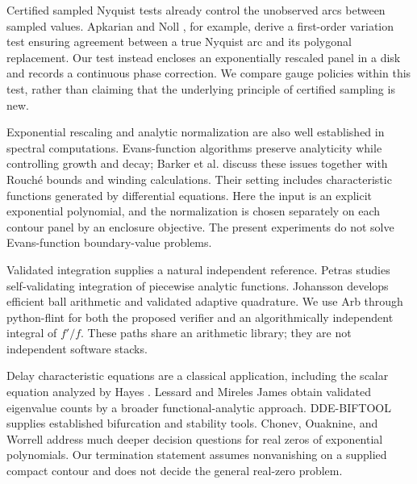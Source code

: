 \documentclass[11pt,a4paper]{article}
\begin{document}
Certified sampled Nyquist tests already control the unobserved arcs between sampled values. Apkarian and Noll \cite{apkarian2018}, for example, derive a first-order variation test ensuring agreement between a true Nyquist arc and its polygonal replacement. Our test instead encloses an exponentially rescaled panel in a disk and records a continuous phase correction. We compare gauge policies within this test, rather than claiming that the underlying principle of certified sampling is new.

Exponential rescaling and analytic normalization are also well established in spectral computations. Evans-function algorithms preserve analyticity while controlling growth and decay; Barker et al. \cite{barker2018} discuss these issues together with Rouch\'e bounds and winding calculations. Their setting includes characteristic functions generated by differential equations. Here the input is an explicit exponential polynomial, and the normalization is chosen separately on each contour panel by an enclosure objective. The present experiments do not solve Evans-function boundary-value problems.

Validated integration supplies a natural independent reference. Petras \cite{petras2002} studies self-validating integration of piecewise analytic functions. Johansson \cite{johansson2017,johansson2018} develops efficient ball arithmetic and validated adaptive quadrature. We use Arb through python-flint for both the proposed verifier and an algorithmically independent integral of $f'/f$. These paths share an arithmetic library; they are not independent software stacks.

Delay characteristic equations are a classical application, including the scalar equation analyzed by Hayes \cite{hayes1950}. Lessard and Mireles James \cite{lessard2020} obtain validated eigenvalue counts by a broader functional-analytic approach. DDE-BIFTOOL \cite{ddebiftool} supplies established bifurcation and stability tools. Chonev, Ouaknine, and Worrell \cite{chonev2023} address much deeper decision questions for real zeros of exponential polynomials. Our termination statement assumes nonvanishing on a supplied compact contour and does not decide the general real-zero problem.
\end{document}

